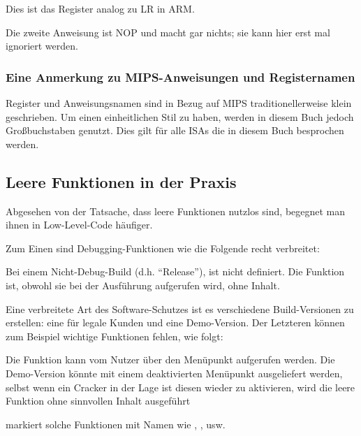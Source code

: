 Dies ist das Register analog zu \ac{LR} in ARM.

Die zweite Anweisung ist \ac{NOP} und macht gar nichts; sie kann hier erst mal ignoriert werden.

\subsubsection{Eine Anmerkung zu MIPS-Anweisungen und Registernamen}

Register und Anweisungsnamen sind in Bezug auf MIPS traditionellerweise klein geschrieben.
Um einen einheitlichen Stil zu haben, werden in diesem Buch jedoch Großbuchstaben genutzt.
Dies gilt für alle \ac{ISA}s die in diesem Buch besprochen werden.

\subsection{Leere Funktionen in der Praxis}

Abgesehen von der Tatsache, dass leere Funktionen nutzlos sind, begegnet man ihnen
in Low-Level-Code häufiger.

Zum Einen sind Debugging-Funktionen wie die Folgende recht verbreitet:



Bei einem Nicht-Debug-Build (d.h. ``Release''), ist  nicht definiert.
Die Funktion  ist, obwohl sie bei der Ausführung aufgerufen wird, ohne Inhalt.

Eine verbreitete Art des Software-Schutzes ist es verschiedene Build-Versionen zu erstellen:
eine für legale Kunden und eine Demo-Version. Der Letzteren können zum Beispiel wichtige
Funktionen fehlen, wie folgt:



Die Funktion kann vom Nutzer über den Menüpunkt  aufgerufen werden.
Die Demo-Version könnte mit einem deaktivierten Menüpunkt ausgeliefert werden, selbst wenn ein
Cracker in der Lage ist diesen wieder zu aktivieren, wird die leere Funktion ohne sinnvollen
Inhalt ausgeführt

\IDA markiert solche Funktionen mit Namen wie , , usw.
